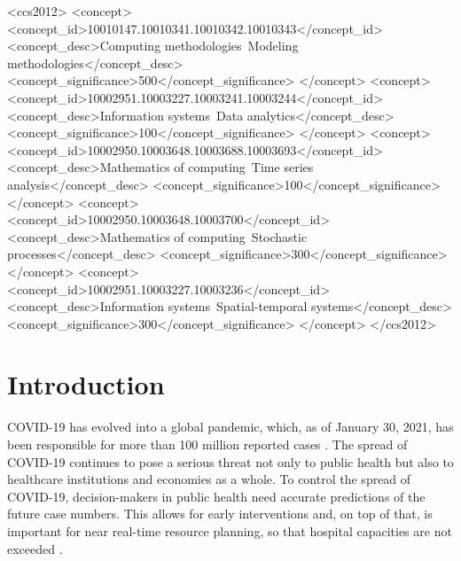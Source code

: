 \documentclass[sigconf, review = false, nonacm = true]{acmart}
\begin{document}
\begin{CCSXML}
<ccs2012>
   <concept>
       <concept_id>10010147.10010341.10010342.10010343</concept_id>
       <concept_desc>Computing methodologies~Modeling methodologies</concept_desc>
       <concept_significance>500</concept_significance>
       </concept>
   <concept>
       <concept_id>10002951.10003227.10003241.10003244</concept_id>
       <concept_desc>Information systems~Data analytics</concept_desc>
       <concept_significance>100</concept_significance>
       </concept>
   <concept>
       <concept_id>10002950.10003648.10003688.10003693</concept_id>
       <concept_desc>Mathematics of computing~Time series analysis</concept_desc>
       <concept_significance>100</concept_significance>
       </concept>
   <concept>
       <concept_id>10002950.10003648.10003700</concept_id>
       <concept_desc>Mathematics of computing~Stochastic processes</concept_desc>
       <concept_significance>300</concept_significance>
       </concept>
    <concept>
        <concept_id>10002951.10003227.10003236</concept_id>
        <concept_desc>Information systems~Spatial-temporal systems</concept_desc>
        <concept_significance>300</concept_significance>
    </concept>
 </ccs2012>
\end{CCSXML}






\maketitle

\section{Introduction}

COVID-19 has evolved into a global pandemic, which, as of January 30, 2021, has been responsible for more than 100 million reported cases \cite{who_coronavirus_2021}. The spread of COVID-19 continues to pose a serious threat not only to public health but also to healthcare institutions and economies as a whole. To control the spread of COVID-19, decision-makers in public health need accurate predictions of the future case numbers. This allows for early interventions and, on top of that, is important for near real-time resource planning, so that hospital capacities are not exceeded \cite{ferguson_report_2020}. 
\end{document}
